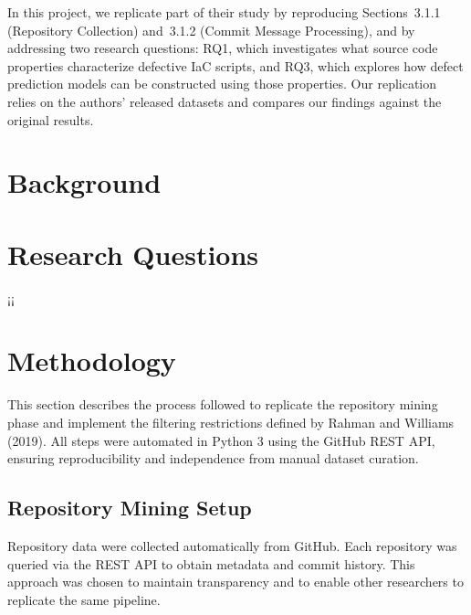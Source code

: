 \documentclass[conference]{IEEEtran}
\begin{document}
	In this project, we replicate part of their study by reproducing Sections~3.1.1 
	(Repository Collection) and~3.1.2 (Commit Message Processing), 
	and by addressing two research questions: RQ1, which investigates 
	what source code properties characterize defective IaC scripts, 
	and RQ3, which explores how defect prediction models can be constructed 
	using those properties. Our replication relies on the authors’ released datasets 
	and compares our findings against the original results.
	
	\section{Background}
	
	\section{Research Questions}
¡¡
	\section{Methodology}
	This section describes the process followed to replicate the repository mining phase and implement the filtering restrictions defined by Rahman and Williams (2019). All steps were automated in Python 3 using the GitHub REST API, ensuring reproducibility and independence from manual dataset curation.
	
	\subsection{Repository Mining Setup}
	Repository data were collected automatically from GitHub. Each repository was queried via the REST API to obtain metadata and commit history. This approach was chosen to maintain transparency and to enable other researchers to replicate the same pipeline. 
	
\end{document}
